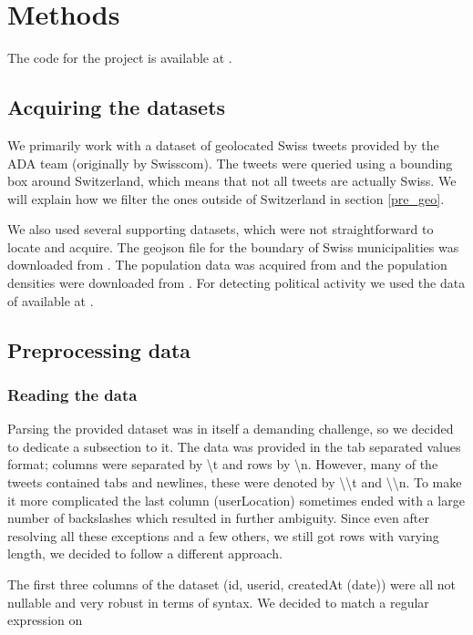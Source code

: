 \section{Methods}

The code for the project is available at  \cite{project_repo}.

\subsection{Acquiring the datasets}

We primarily work with a dataset of geolocated Swiss tweets provided by the ADA team (originally by Swisscom). The tweets were queried using a bounding box around Switzerland, which means that not all tweets are actually Swiss. We will explain how we filter the ones outside of Switzerland in section \ref{pre_geo}.

We also used several supporting datasets, which were not straightforward to locate and acquire. The geojson file for the boundary of Swiss municipalities was downloaded from \cite{swiss_geo}. The population data was acquired from \cite{pop_data} and the population densities were downloaded from \cite{swiss_pop_density}. For detecting political activity we used the data of \cite{tw_useful} available at \cite{swiss_political_users}.
\subsection{Preprocessing data}

\subsubsection{Reading the data}

Parsing the provided dataset was in itself a demanding challenge, so we decided to dedicate a subsection to it. The data was provided in the tab separated values format; columns were separated by \textbackslash t and rows by \textbackslash n. However, many of the tweets contained tabs and newlines, these were denoted by \textbackslash\textbackslash t and \textbackslash\textbackslash n. To make it more complicated the last column (userLocation) sometimes ended with a large number of backslashes which resulted in further ambiguity. Since even after resolving all these exceptions and a few others, we still got rows with varying  length, we decided to follow a different approach.

The first three columns of the dataset (id, userid, createdAt (date)) were all not nullable and very robust in terms of syntax. We decided to match a regular expression on


